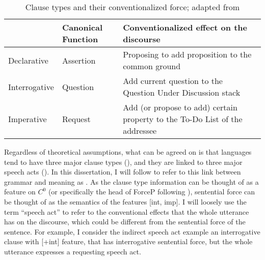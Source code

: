 \begin{table}[H]
\begin{center}
\begin{tabular}{l|l|p{8cm}} 
\hline 
& Canonical Function & Conventionalized effect on the discourse \\
\hline
Declarative & Assertion & Proposing to add proposition to the common ground \\ 
\hline
Interrogative & Question & Add current question to the Question Under Discussion stack \\
\hline
Imperative & Request & Add (or propose to add) certain property to the To-Do List of the addressee \\ 
\hline
\end{tabular} 
\end{center}
\caption{Clause types and their conventionalized force; adapted from \textcite[p.238]{portner2004}}
\label{tab:intro:portner2004}
\end{table}



Regardless of theoretical assumptions, what can be agreed on is that languages tend to have three major clause types (\diis{}), and they are linked to three major speech acts (\aqrs{}). In this dissertation, I will follow \textcite{chierchia1990textbook} to refer to this link between grammar and meaning as .
As the clause type information can be thought of as a feature on $C^{0}$ (or specifically the head of ForceP following \cite{rizzi1997}), sentential force can be thought of as the semantics of the features [\textpm int, imp]. I will loosely use the term ``speech act'' to refer to the conventional effects that the whole utterance has on the discourse, which could be different from the sentential force of the sentence. For example, I consider the indirect speech act example  an interrogative clause with [+int] feature, that has interrogative sentential force, but the whole utterance expresses a requesting speech act. 



